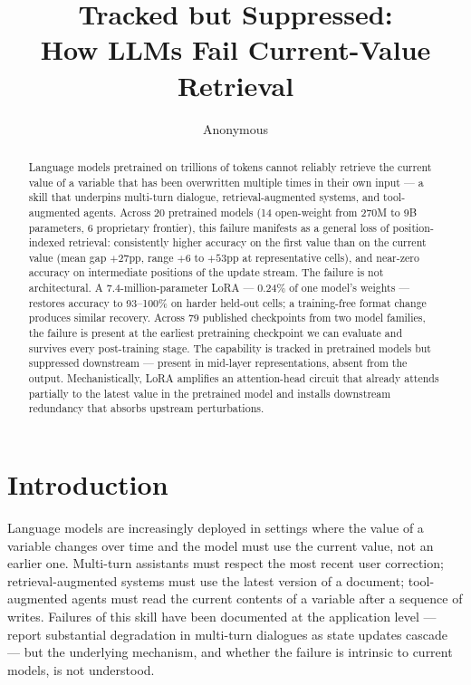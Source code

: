 \documentclass[11pt]{article}
\title{Tracked but Suppressed:\\
How LLMs Fail Current-Value Retrieval}
\author{Anonymous}
\begin{document}
\maketitle

\begin{abstract}
Language models pretrained on trillions of tokens cannot reliably
retrieve the current value of a variable that has been overwritten
multiple times in their own input --- a skill that underpins
multi-turn dialogue, retrieval-augmented systems, and tool-augmented
agents.
Across 20 pretrained models (14 open-weight from 270M to 9B
parameters, 6 proprietary frontier), this failure manifests as a
general loss of position-indexed retrieval: consistently higher
accuracy on the first value than on the current value (mean gap
$+27$pp, range $+6$ to $+53$pp at representative cells), and
near-zero accuracy on intermediate positions of the update stream.
The failure is not architectural.
A 7.4-million-parameter LoRA --- 0.24\% of one model's weights ---
restores accuracy to 93--100\% on harder held-out cells; a
training-free format change produces similar recovery.
Across 79 published checkpoints from two model families, the failure
is present at the earliest pretraining checkpoint we can evaluate and
survives every post-training stage.
The capability is tracked in pretrained models but suppressed
downstream --- present in mid-layer representations, absent from the
output.
Mechanistically, LoRA amplifies an attention-head circuit that
already attends partially to the latest value in the pretrained
model and installs downstream redundancy that absorbs upstream
perturbations.
\end{abstract}

\section{Introduction}
\label{sec:intro}

Language models are increasingly deployed in settings where the value
of a variable changes over time and the model must use the current
value, not an earlier one.
Multi-turn assistants must respect the most recent user correction;
retrieval-augmented systems must use the latest version of a document;
tool-augmented agents must read the current contents of a variable
after a sequence of writes.
Failures of this skill have been documented at the application level
--- \citet{laban2025multiturn} report substantial degradation in
multi-turn dialogues as state updates cascade --- but the underlying
mechanism, and whether the failure is intrinsic to current models, is
not understood.
\end{document}
